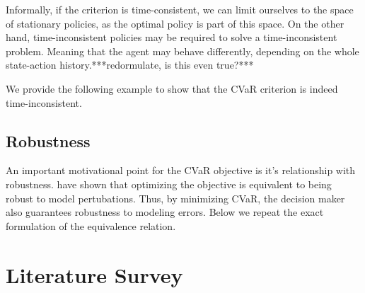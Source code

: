 Informally, if the criterion is time-consistent, we can limit ourselves to the space of stationary policies, as the optimal policy is part of this space. On the other hand, time-inconsistent policies may be required to solve a time-inconsistent problem. Meaning that the agent may behave differently, depending on the whole state-action history.***redormulate, is this even true?***

We provide the following example to show that the CVaR criterion is indeed time-inconsistent.




\subsection{Robustness}

An important motivational point for the CVaR objective  is it's relationship with robustness. \citet{chow2015risk} have shown that optimizing the objective is equivalent to being robust to model pertubations. Thus, by minimizing CVaR, the decision maker also guarantees robustness to modeling errors. Below we repeat the exact formulation of the equivalence relation.




\section{Literature Survey}\label{sec:prelim:literature}



